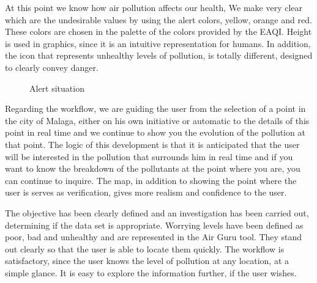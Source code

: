 At this point we know how air pollution affects our health, We make very clear which are the undesirable values by using the alert colors, yellow, orange and red. These colors are chosen in the palette of the colors provided by the EAQI.
Height is used in graphics, since it is an intuitive representation for humans. In addition, the icon that represents unhealthy levels of pollution, is
totally different, designed to clearly convey danger. \\
\newpage
\begin{figure}[ht]
    \centering
    \hfill
  
  \caption{Alert situation}
    \end{figure}

    Regarding the workflow, we are guiding the user from the selection of a point in the city of Malaga, either on his own initiative
    or automatic to the details of this point in real time and we continue to show you the evolution of the pollution at that point.
    The logic of this development is that it is anticipated that the user will be interested in the pollution that surrounds him in real time and if
    you want to know the breakdown of the pollutants at the point where you are, you can continue to inquire. The map, in addition to showing
    the point where the user is serves as verification, gives more realism and confidence to the user.

\begin{itemize}
    \done The objective has been clearly defined and an investigation has been carried out, determining if the data set is appropriate.
    \done Worrying levels have been defined as poor, bad and unhealthy and are represented in the Air Guru tool. They stand out clearly so that the user is able to locate them quickly.
     \done The workflow is satisfactory, since the user knows the level of pollution at any location, at a simple glance. It is easy to explore the information further, if the user wishes.
         
\end{itemize}
 

\newpage